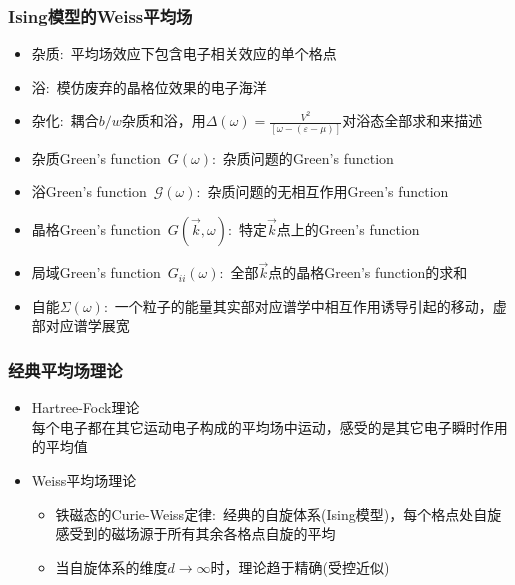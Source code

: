 \frame
{
	\frametitle{\textrm{Ising}模型的\textrm{Weiss}平均场}
	\begin{itemize}
		\item 杂质:~平均场效应下包含电子相关效应的单个格点
		\item 浴:~模仿废弃的晶格位效果的电子海洋
		\item 杂化:~耦合$b/w$杂质和浴，用$\Delta(\omega)=\frac{V^2}{[\omega-(\varepsilon-\mu)]}$对浴态全部求和来描述
		\item 杂质\textrm{Green's function}~$G(\omega)$:~杂质问题的\textrm{Green's function}
		\item 浴\textrm{Green's function}~$\mathcal{G}(\omega)$:~杂质问题的无相互作用\textrm{Green's function}
		\item 晶格\textrm{Green's function}~$G(\vec k,\omega)$:~特定$\vec k$点上的\textrm{Green's function}
		\item 局域\textrm{Green's function}~$G_{ii}(\omega)$:~全部$\vec k$点的晶格\textrm{Green's function}的求和
		\item 自能$\Sigma(\omega)$:~一个粒子的能量其实部对应谱学中相互作用诱导引起的移动，虚部对应谱学展宽
	\end{itemize}
}

\frame
{
	\frametitle{经典平均场理论}
	\begin{itemize}
		\item \textrm{Hartree-Fock}理论\\
			每个电子都在其它运动电子构成的平均场中运动，感受的是其它电子瞬时作用的平均值
		\item \textrm{Weiss}平均场理论
			\begin{itemize}
				\item 铁磁态的\textrm{Curie-Weiss}定律:~经典的自旋体系(\textrm{Ising}模型)，每个格点处自旋感受到的磁场源于所有其余各格点自旋的平均
				\item 当自旋体系的维度$d\rightarrow\infty$时，理论趋于精确(受控近似)
			\end{itemize}
\end{itemize}
}

